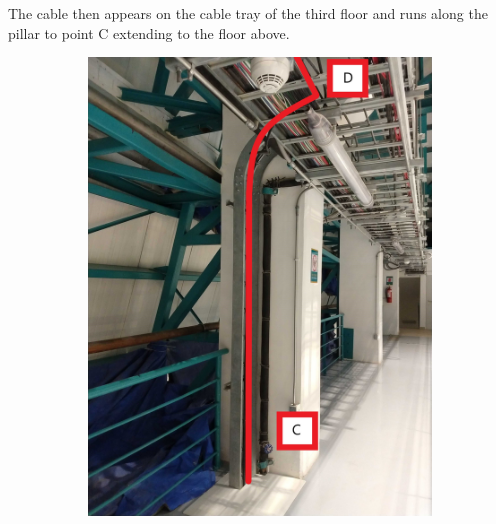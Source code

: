 The cable then appears on the cable tray of the third floor and runs along the pillar to point C extending to the floor above.

  \begin{figure}
    \centering
    \begin{subfigure}{0.45\textwidth}
      \centering
      \includegraphics[width=\textwidth]{images/14.jpg}
    \end{subfigure}
   \hfill
    \begin{subfigure}{0.45\textwidth}
      \centering

\end{subfigure}
\end{figure}
